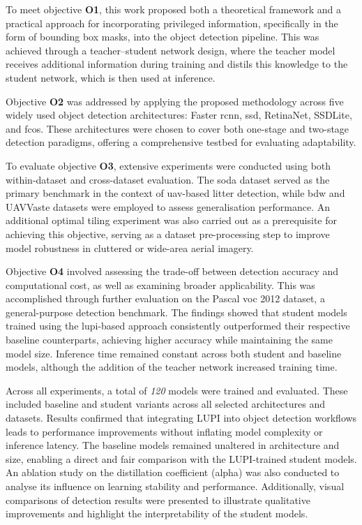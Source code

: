 To meet objective \textbf{O1}, this work proposed both a theoretical framework and a practical approach for incorporating privileged information, specifically in the form of bounding box masks, into the object detection pipeline. This was achieved through a teacher–student network design, where the teacher model receives additional information during training and distils this knowledge to the student network, which is then used at inference.

Objective \textbf{O2} was addressed by applying the proposed methodology across five widely used object detection architectures: Faster \gls{rcnn}, \gls{ssd}, RetinaNet, SSDLite, and \gls{fcos}. These architectures were chosen to cover both one-stage and two-stage detection paradigms, offering a comprehensive testbed for evaluating adaptability.

To evaluate objective \textbf{O3}, extensive experiments were conducted using both within-dataset and cross-dataset evaluation. The \gls{soda} dataset served as the primary benchmark in the context of \gls{uav}-based litter detection, while \gls{bdw} and UAVVaste datasets were employed to assess generalisation performance. An additional optimal tiling experiment was also carried out as a prerequisite for achieving this objective, serving as a dataset pre-processing step to improve model robustness in cluttered or wide-area aerial imagery.

Objective \textbf{O4} involved assessing the trade-off between detection accuracy and computational cost, as well as examining broader applicability. This was accomplished through further evaluation on the Pascal \gls{voc} 2012 dataset, a general-purpose detection benchmark. The findings showed that student models trained using the \gls{lupi}-based approach consistently outperformed their respective baseline counterparts, achieving higher accuracy while maintaining the same model size. Inference time remained constant across both student and baseline models, although the addition of the teacher network increased training time.

Across all experiments, a total of \textit{120} models were trained and evaluated. These included baseline and student variants across all selected architectures and datasets. Results confirmed that integrating LUPI into object detection workflows leads to performance improvements without inflating model complexity or inference latency. The baseline models remained unaltered in architecture and size, enabling a direct and fair comparison with the LUPI-trained student models. An ablation study on the distillation coefficient (\gls{alpha}) was also conducted to analyse its influence on learning stability and performance. Additionally, visual comparisons of detection results were presented to illustrate qualitative improvements and highlight the interpretability of the student models.

